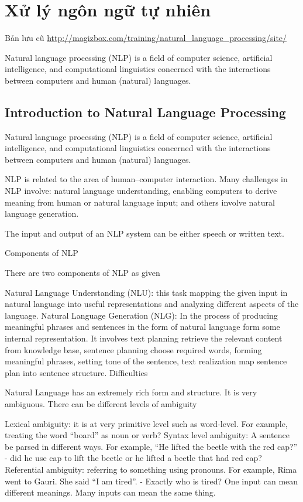 \chapter{Xử lý ngôn ngữ tự nhiên}

Bản lưu cũ \href{http://magizbox.com/training/natural_language_processing/site/}{http://magizbox.com/training/natural\_language\_processing/site/}


Natural language processing (NLP) is a field of computer science, artificial intelligence, and computational linguistics concerned with the interactions between computers and human (natural) languages.

\section{Introduction to Natural Language Processing}

Natural language processing (NLP) is a field of computer science, artificial intelligence, and computational linguistics concerned with the interactions between computers and human (natural) languages.

NLP is related to the area of human–computer interaction. Many challenges in NLP involve: natural language understanding, enabling computers to derive meaning from human or natural language input; and others involve natural language generation.

The input and output of an NLP system can be either speech or written text.

Components of NLP

There are two components of NLP as given

Natural Language Understanding (NLU): this task mapping the given input in natural language into useful representations and analyzing different aspects of the language.
Natural Language Generation (NLG): In the process of producing meaningful phrases and sentences in the form of natural language form some internal representation. It involves text planning retrieve the relevant content from knowledge base, sentence planning choose required words, forming meaningful phrases, setting tone of the sentence, text realization map sentence plan into sentence structure.
Difficulties

Natural Language has an extremely rich form and structure. It is very ambiguous. There can be different levels of ambiguity

Lexical ambiguity: it is at very primitive level such as word-level. For example, treating the word “board” as noun or verb?
Syntax level ambiguity: A sentence be parsed in different ways. For example, “He lifted the beetle with the red cap?” - did he use cap to lift the beetle or he lifted a beetle that had red cap?
Referential ambiguity: referring to something using pronouns. For example, Rima went to Gauri. She said “I am tired”. - Exactly who is tired?
One input can mean different meanings.
Many inputs can mean the same thing.

